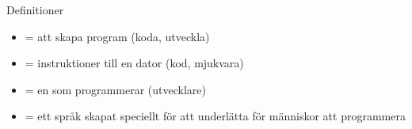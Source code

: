 \documentclass{simpleslides}
\begin{document}
  
  
  
  
  
  
  
  

\begin{Slide}{Definitioner}
  \begin{itemize}
    \item {}         = \pause att skapa program (koda, utveckla) \pause 
    \item {}             = instruktioner till en dator (kod, mjukvara) \pause
    \item {}       = en som programmerar (utvecklare) \pause
    \item {} = ett språk skapat speciellt för att underlätta för människor att programmera
  \end{itemize}
\end{Slide}
\end{document}
